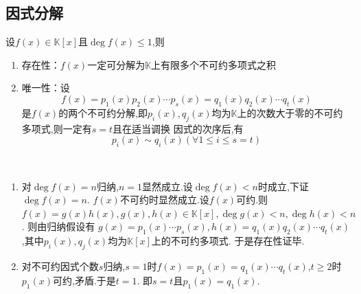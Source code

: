 \subsection{因式分解}
\begin{formal}
\begin{theorem}[因式分解定理]\label{thm:因式分解定理}
    设$f\left(x\right)\in\mathbb{K}\left[x\right]$且$\deg f\left(x\right)\leqslant 1$,则
    \begin{enumerate}[label={\textup{(\arabic*)}}]
        \item 存在性：$f\left(x\right)$一定可分解为$\mathbb{K}$上有限多个不可约多项式之积
        \item 唯一性：设\[
        f\left(x\right)=p_1\left(x\right)p_2\left(x\right)\cdots p_s\left(x\right)=q_1\left(x\right)q_2\left(x\right)\cdots q_t\left(x\right)
        \]
        是$f\left(x\right)$的两个不可约分解,即$p_i\left(x\right),q_j\left(x\right)$均为$\mathbb{K}$上的次数大于零的不可约多项式,则一定有$s=t$且在适当调换
        因式的次序后,有\[
        p_i\left(x\right)\sim q_i\left(x\right)\left(\forall 1\leqslant i\leqslant s=t\right)
        \]
    \end{enumerate}
\end{theorem}
\begin{Proof}\,

\begin{enumerate}[label={\textup{(\arabic*)}}]
    \item 对$\deg f\left(x\right)=n$归纳,$n=1$显然成立.设$\deg f\left(x\right)<n$时成立,下证$\deg f\left(x\right)=n$.
    $f\left(x\right)$不可约时显然成立.设$f\left(x\right)$可约.则
    $f\left(x\right)=g\left(x\right)h\left(x\right),g\left(x\right),h\left(x\right)\in\mathbb{K}\left[x\right],\deg g\left(x\right)<n,\deg h\left(x\right)<n$.
    则由归纳假设有
    $g\left(x\right)=p_1\left(x\right)\cdots p_s\left(x\right),h\left(x\right)=q_1\left(x\right)q_2\left(x\right)\cdots q_t\left(x\right)$,其中$p_i\left(x\right),q_j\left(x\right)$均为$\mathbb{K}\left[x\right]$上的不可约多项式.
    于是存在性证毕.

    \item 对不可约因式个数$s$归纳,$s=1$时$f\left(x\right)=p_1\left(x\right)=q_1\left(x\right)\cdots q_t\left(
        x\right)$,$t\geqslant 2$时$p_1\left(x\right)$可约,矛盾.于是$t = 1.$
    即$s=t$且$p_1\left(x\right)=q_1\left(x\right)$.


\end{enumerate}
\end{Proof}
\end{formal}
